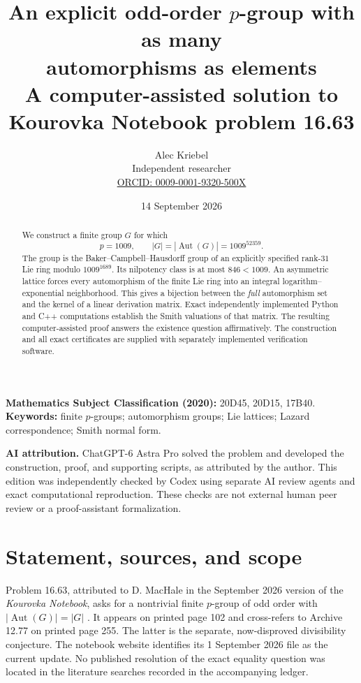 \documentclass[11pt]{article}
\title{An explicit odd-order $p$-group with as many\\automorphisms as elements\\[5pt]
\large A computer-assisted solution to Kourovka Notebook problem 16.63}
\author{Alec Kriebel\\[3pt]
\small Independent researcher\\
\small\href{https://orcid.org/0009-0001-9320-500X}{ORCID: 0009-0001-9320-500X}}
\date{14 September 2026}
\theoremstyle{definition}\newtheorem{definition}[theorem]{Definition}
\theoremstyle{remark}\newtheorem{remark}[theorem]{Remark}
\DeclareMathOperator{\Aut}{Aut}
\begin{document}
\maketitle
\begin{abstract}
We construct a finite group $G$ for which
\[
 p=1009,\qquad |G|=|\Aut(G)|=1009^{52359}.
\]
The group is the Baker--Campbell--Hausdorff group of an explicitly specified
rank-$31$ Lie ring modulo $1009^{1689}$. Its nilpotency class is at most $846<1009$.
An asymmetric lattice forces every automorphism of the finite Lie ring into an
integral logarithm--exponential neighborhood. This gives a bijection between the
\emph{full} automorphism set and the kernel of a linear derivation matrix.
Exact independently implemented Python and C++ computations establish the
Smith valuations of that matrix. The resulting computer-assisted proof answers the existence question
affirmatively. The construction and all exact certificates are supplied
with separately implemented verification software.
\end{abstract}
\medskip
\noindent\textbf{Mathematics Subject Classification (2020):} 20D45, 20D15, 17B40.\\
\textbf{Keywords:} finite $p$-groups; automorphism groups; Lie lattices;
Lazard correspondence; Smith normal form.

\medskip
\noindent\textbf{AI attribution.} ChatGPT-6 Astra Pro solved the problem and
developed the construction, proof, and supporting scripts, as attributed by
the author. This edition was independently checked by Codex using separate
AI review agents and exact computational reproduction. These checks are not
external human peer review or a proof-assistant formalization.

\clearpage
{\small\tableofcontents}
\clearpage

\section{Statement, sources, and scope}
Problem 16.63, attributed to D. MacHale in the September 2026 version of the
\emph{Kourovka Notebook}, asks for a nontrivial finite $p$-group of
odd order with $|\Aut(G)|=|G|$ \cite{KN}. It appears on printed page 102 and
cross-refers to Archive 12.77 on printed page 255. The latter is the separate,
now-disproved divisibility conjecture. The notebook website identifies its
1 September 2026 file as the current update. No published resolution of the
exact equality question was located in the literature searches recorded in the
accompanying ledger.
\end{document}
